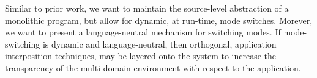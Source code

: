 Similar to prior work, we want to maintain the source-level abstraction of
a monolithic program, but allow for dynamic, at run-time, mode switches.
%
Morever, we want to present a language-neutral mechanism for switching modes.
%
If mode-switching is dynamic and language-neutral, then orthogonal, application
interposition techniques, may be layered onto the system to increase the
transparency of the multi-domain environment with respect to the application.
